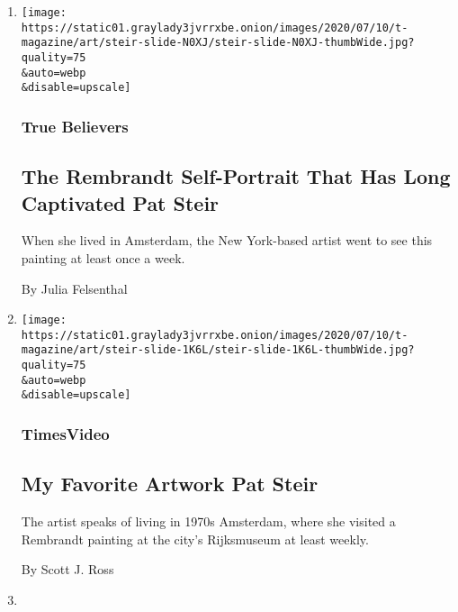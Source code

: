 \begin{enumerate}
\def\labelenumi{\arabic{enumi}.}
\item
  \href{/2020/07/21/t-magazine/pat-steir.html}{}

  \texttt{[image: https://static01.graylady3jvrrxbe.onion/images/2020/07/10/t-magazine/art/steir-slide-N0XJ/steir-slide-N0XJ-thumbWide.jpg?quality=75\\\&auto=webp\\\&disable=upscale]}

  \hypertarget{true-believers-14}{%
  \subsubsection{True Believers}\label{true-believers-14}}

  \hypertarget{the-rembrandt-self-portrait-that-has-long-captivated-pat-steir}{%
  \subsection{The Rembrandt Self-Portrait That Has Long Captivated Pat
  Steir}\label{the-rembrandt-self-portrait-that-has-long-captivated-pat-steir}}

  When she lived in Amsterdam, the New York-based artist went to see
  this painting at least once a week.

  By Julia Felsenthal
\item
  \href{/video/t-magazine/art/100000007194871/my-favorite-artwork-pat-steir.html}{}

  \texttt{[image: https://static01.graylady3jvrrxbe.onion/images/2020/07/10/t-magazine/art/steir-slide-1K6L/steir-slide-1K6L-thumbWide.jpg?quality=75\\\&auto=webp\\\&disable=upscale]}

  \hypertarget{timesvideo}{%
  \subsubsection{TimesVideo}\label{timesvideo}}

  \hypertarget{my-favorite-artwork--pat-steir}{%
  \subsection{My Favorite Artwork \textbar{} Pat
  Steir}\label{my-favorite-artwork--pat-steir}}

  The artist speaks of living in 1970s Amsterdam, where she visited a
  Rembrandt painting at the city's Rijksmuseum at least weekly.

  By Scott J. Ross
\item
  \href{/2020/07/20/t-magazine/ruth-asawa.html}{}


\end{enumerate}
